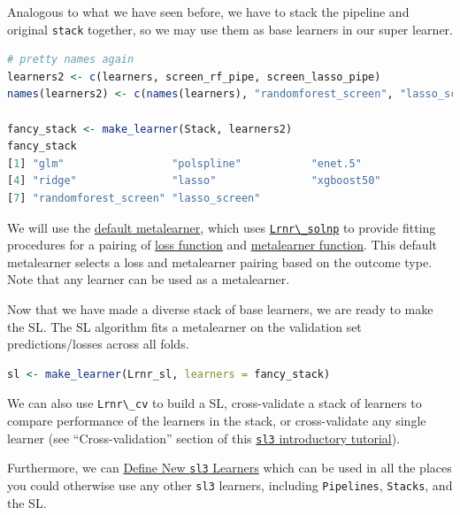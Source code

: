 \documentclass[
  12pt, krantz2,
]{book}
\newcommand{\passthrough}[1]{#1}
\theoremstyle{definition}
\theoremstyle{definition}
\theoremstyle{definition}
\newcommand{\1}{\mathbbm{1}}
\begin{document}
Analogous to what we have seen before, we have to stack the pipeline and
original \passthrough{\lstinline!stack!} together, so we may use them as base learners in our super
learner.

\begin{lstlisting}[language=R]
# pretty names again
learners2 <- c(learners, screen_rf_pipe, screen_lasso_pipe)
names(learners2) <- c(names(learners), "randomforest_screen", "lasso_screen")

fancy_stack <- make_learner(Stack, learners2)
fancy_stack
[1] "glm"                 "polspline"           "enet.5"             
[4] "ridge"               "lasso"               "xgboost50"          
[7] "randomforest_screen" "lasso_screen"       
\end{lstlisting}

We will use the \href{https://tlverse.org/sl3/reference/default_metalearner.html}{default
metalearner},
which uses
\href{https://tlverse.org/sl3/reference/Lrnr_solnp.html}{\passthrough{\lstinline!Lrnr\_solnp!}} to
provide fitting procedures for a pairing of \href{https://tlverse.org/sl3/reference/loss_functions.html}{loss
function} and
\href{https://tlverse.org/sl3/reference/metalearners.html}{metalearner
function}. This
default metalearner selects a loss and metalearner pairing based on the outcome
type. Note that any learner can be used as a metalearner.

Now that we have made a diverse stack of base learners, we are ready to make the
SL. The SL algorithm fits a metalearner on the validation set
predictions/losses across all folds.

\begin{lstlisting}[language=R]
sl <- make_learner(Lrnr_sl, learners = fancy_stack)
\end{lstlisting}

We can also use \passthrough{\lstinline!Lrnr\_cv!} to build a SL, cross-validate a stack of
learners to compare performance of the learners in the stack, or cross-validate
any single learner (see ``Cross-validation'' section of this \href{https://tlverse.org/sl3/articles/intro_sl3.html}{\passthrough{\lstinline!sl3!}
introductory tutorial}).

Furthermore, we can \href{https://tlverse.org/sl3/articles/custom_lrnrs.html}{Define New \passthrough{\lstinline!sl3!}
Learners} which can be used
in all the places you could otherwise use any other \passthrough{\lstinline!sl3!} learners, including
\passthrough{\lstinline!Pipelines!}, \passthrough{\lstinline!Stacks!}, and the SL.
\end{document}
